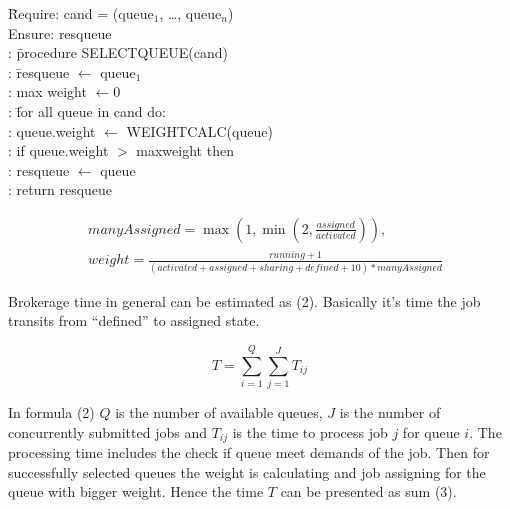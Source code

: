 \begin{tabbing}
\hspace{0.5in}\=
     Require: cand = (queue$_1$, \ldots, queue$_n$) \\
  \> Ensure: res{\textunderscore}queue \\
  : \hspace{1em}\= procedure SELECT{\textunderscore}QUEUE(cand) \\
  :             \> \hspace{1em}\= res{\textunderscore}queue $\leftarrow$%
queue$_1$ \\
  :             \>             \> \hspace{0.1in} max{\textunderscore}%
weight $\leftarrow 0$ \\
  :             \> \hspace{1em}\= for all queue in cand do: \\
  :             \>             \> queue.weight $\leftarrow$ %
WEIGHT{\textunderscore}CALC(queue) \\
  :             \>             \> \hspace{1em} if queue.weight $>$ %
max{\textunderscore}weight then \\
  :             \>             \> \hspace{2em} res{\textunderscore}queue%
$\leftarrow$ queue \\
  :             \>             \> \hspace{0.5em} return %
res{\textunderscore}queue
\end{tabbing}

\begin{equation}
  \begin{aligned}
    & manyAssigned = \max(1, \min(2, \frac{assigned}{activated})), \\
    & weight = \frac{running + 1}{(activated + assigned + sharing + defined +
        10) * manyAssigned}
  \end{aligned}
\end{equation}

Brokerage time in general can be estimated as (2). Basically it's time the job
transits from ``defined'' to assigned state.  

\begin{equation}
    T = \sum_{i = 1}^{Q} \sum_{j = 1}^{J} T_{ij}
\end{equation}

In formula (2) $Q$ is the number of available queues, $J$ is the number of
concurrently  submitted jobs and $T_{ij}$ is the time to process job $j$ for
queue $i$. The processing time includes the check if queue meet demands of the
job. Then for successfully selected queues the weight is calculating and job
assigning for the queue with bigger weight. Hence the time $T$ can be presented as sum (3).

